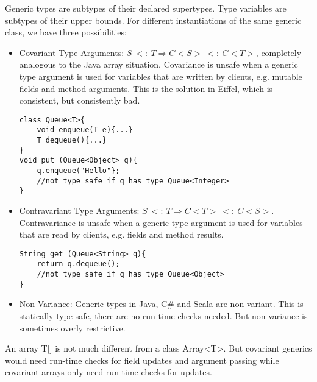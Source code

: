 \begin{mytitle} Generic types are subtypes of their declared supertypes. Type variables are subtypes of their upper bounds. For different instantiations of the same generic class, we have three possibilities:
\begin{itemize}
    \item Covariant Type Arguments: $S\ <:\ T \Rightarrow C<S>\ <:\ C<T>$, completely analogous to the Java array situation. Covariance is unsafe when a generic type argument is used for variables that are written by clients, e.g. mutable fields and method arguments. This is the solution in Eiffel, which is consistent, but consistently bad.
    \lstset{language = Java}
    \begin{lstlisting}
class Queue<T>{
    void enqueue(T e){...}
    T dequeue(){...}
}
void put (Queue<Object> q){
    q.enqueue("Hello"}; 
    //not type safe if q has type Queue<Integer>
}
    \end{lstlisting}
    \item Contravariant Type Arguments: $S\ <:\ T \Rightarrow C<T>\ <:\ C<S>$. Contravariance is unsafe when a generic type argument is used for variables that are read by clients, e.g. fields and method results.
    \begin{lstlisting}
String get (Queue<String> q){
    return q.dequeue();
    //not type safe if q has type Queue<Object>
}    
    \end{lstlisting}
    \item Non-Variance: Generic types in Java, C\# and Scala are non-variant. This is statically type safe, there are no run-time checks needed. But non-variance is sometimes overly restrictive.
\end{itemize}
\end{mytitle}
\begin{mytitle} An array T[] is not much different from a class Array<T>. But covariant generics would need run-time checks for field updates and argument passing while covariant arrays only need run-time checks for updates. 
\end{mytitle}

